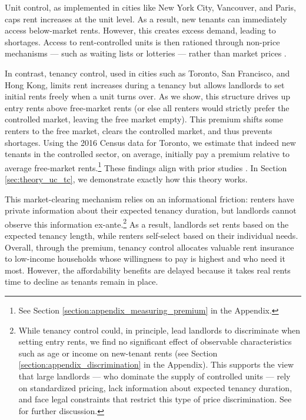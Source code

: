 \documentclass[parskip=full]{article}
\begin{document}
Unit control, as implemented in cities like New York City, Vancouver, and Paris, caps rent increases at the unit level. As a result, new tenants can immediately access below-market rents. However, this creates excess demand, leading to shortages. Access to rent-controlled units is then rationed through non-price mechanisms — such as waiting lists or lotteries — rather than market prices \citep{gl-2003}.

In contrast, tenancy control, used in cities such as Toronto, San Francisco, and Hong Kong, limits rent increases during a tenancy but allows landlords to set initial rents freely when a unit turns over. As we show, this structure drives up entry rents above free-market rents (or else all renters would strictly prefer the controlled market, leaving the free market empty). This premium shifts some renters to the free market, clears the controlled market, and thus prevents shortages. Using the 2016 Census data for Toronto, we estimate that indeed new tenants in the controlled sector, on average, initially pay a premium relative to average free-market rents.\footnote{See Section \ref{section:appendix_measuring_premium} in the Appendix.} These findings align with prior studies \citep{nagy-1997,early-2000,cjq-2023}. In Section \ref{sec:theory_uc_tc}, we demonstrate exactly how this theory works.

This market-clearing mechanism relies on an informational friction: renters have private information about their expected tenancy duration, but landlords cannot observe this information ex-ante.\footnote{While tenancy control could, in principle, lead landlords to discriminate when setting entry rents, we find no significant effect of observable characteristics such as age or income on new-tenant rents (see Section \ref{section:appendix_discrimination} in the Appendix). This supports the view that large landlords — who dominate the supply of controlled units — rely on standardized pricing, lack information about expected tenancy duration, and face legal constraints that restrict this type of price discrimination. See \citet{be-2000} for further discussion.} As a result, landlords set rents based on the expected tenancy length, while renters self-select based on their individual needs. Overall, through the premium, tenancy control allocates valuable rent insurance to low-income households whose willingness to pay is highest and who need it most. However, the affordability benefits are delayed because it takes real rents time to decline as tenants remain in place.
\end{document}

